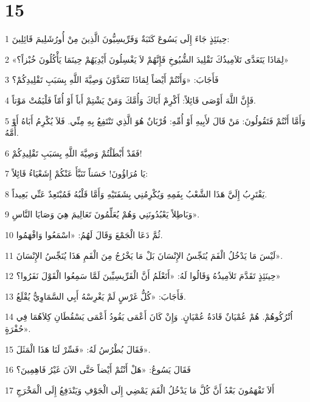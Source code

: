 \chapter{15}

\par 1 حِينَئِذٍ جَاءَ إِلَى يَسُوعَ كَتَبَةٌ وَفَرِّيسِيُّونَ الَّذِينَ مِنْ أُورُشَلِيمَ قَائِلِينَ:
\par 2 «لِمَاذَا يَتَعَدَّى تَلاَمِيذُكَ تَقْلِيدَ الشُّيُوخِ فَإِنَّهُمْ لاَ يَغْسِلُونَ أَيْدِيَهُمْ حِينَمَا يَأْكُلُونَ خُبْزاً؟»
\par 3 فَأَجَابَ: «وَأَنْتُمْ أَيْضاً لِمَاذَا تَتَعَدَّوْنَ وَصِيَّةَ اللَّهِ بِسَبَبِ تَقْلِيدِكُمْ؟
\par 4 فَإِنَّ اللَّهَ أَوْصَى قَائِلاً: أَكْرِمْ أَبَاكَ وَأُمَّكَ وَمَنْ يَشْتِمْ أَباً أَوْ أُمّاً فَلْيَمُتْ مَوْتاً.
\par 5 وَأَمَّا أَنْتُمْ فَتَقُولُونَ: مَنْ قَالَ لأَبِيهِ أَوْ أُمِّهِ: قُرْبَانٌ هُوَ الَّذِي تَنْتَفِعُ بِهِ مِنِّي. فَلاَ يُكْرِمُ أَبَاهُ أَوْ أُمَّهُ.
\par 6 فَقَدْ أَبْطَلْتُمْ وَصِيَّةَ اللَّهِ بِسَبَبِ تَقْلِيدِكُمْ!
\par 7 يَا مُرَاؤُونَ! حَسَناً تَنَبَّأَ عَنْكُمْ إِشَعْيَاءُ قَائِلاً:
\par 8 يَقْتَرِبُ إِلَيَّ هَذَا الشَّعْبُ بِفَمِهِ وَيُكْرِمُنِي بِشَفَتَيْهِ وَأَمَّا قَلْبُهُ فَمُبْتَعِدٌ عَنِّي بَعِيداً.
\par 9 وَبَاطِلاً يَعْبُدُونَنِي وَهُمْ يُعَلِّمُونَ تَعَالِيمَ هِيَ وَصَايَا النَّاسِ».
\par 10 ثُمَّ دَعَا الْجَمْعَ وَقَالَ لَهُمُ: «اسْمَعُوا وَافْهَمُوا.
\par 11 لَيْسَ مَا يَدْخُلُ الْفَمَ يُنَجِّسُ الإِنْسَانَ بَلْ مَا يَخْرُجُ مِنَ الْفَمِ هَذَا يُنَجِّسُ الإِنْسَانَ».
\par 12 حِينَئِذٍ تَقَدَّمَ تَلاَمِيذُهُ وَقَالُوا لَهُ: «أَتَعْلَمُ أَنَّ الْفَرِّيسِيِّينَ لَمَّا سَمِعُوا الْقَوْلَ نَفَرُوا؟»
\par 13 فَأَجَابَ: «كُلُّ غَرْسٍ لَمْ يَغْرِسْهُ أَبِي السَّمَاوِيُّ يُقْلَعُ.
\par 14 اُتْرُكُوهُمْ. هُمْ عُمْيَانٌ قَادَةُ عُمْيَانٍ. وَإِنْ كَانَ أَعْمَى يَقُودُ أَعْمَى يَسْقُطَانِ كِلاَهُمَا فِي حُفْرَةٍ».
\par 15 فَقَالَ بُطْرُسُ لَهُ: «فَسِّرْ لَنَا هَذَا الْمَثَلَ».
\par 16 فَقَالَ يَسُوعُ: «هَلْ أَنْتُمْ أَيْضاً حَتَّى الآنَ غَيْرُ فَاهِمِينَ؟
\par 17 أَلاَ تَفْهَمُونَ بَعْدُ أَنَّ كُلَّ مَا يَدْخُلُ الْفَمَ يَمْضِي إِلَى الْجَوْفِ وَيَنْدَفِعُ إِلَى الْمَخْرَجِ
